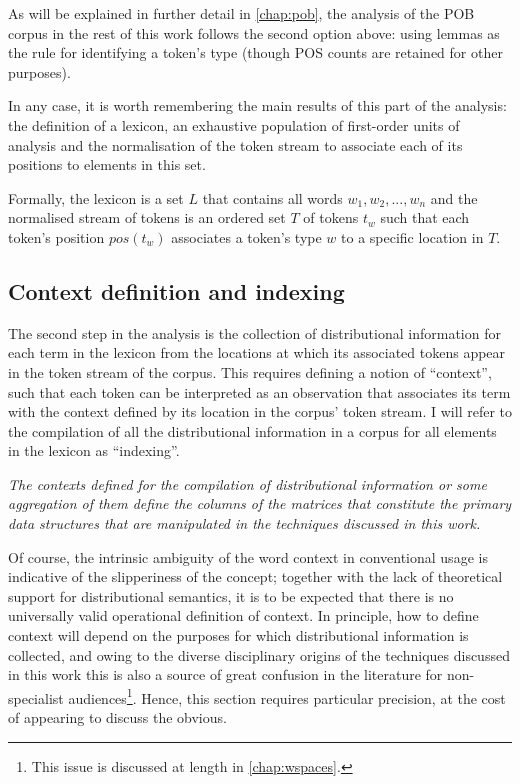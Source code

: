 As will be explained in further detail in \autoref{chap:pob}, the analysis of the POB corpus in the rest of this work follows the second option above: using lemmas as the rule for identifying a token's type (though POS counts are retained for other purposes).

In any case, it is worth remembering the main results of this part of the analysis: the definition of a lexicon, an exhaustive population of first-order units of analysis and the normalisation of the token stream to associate each of its positions to elements in this set.

Formally, the lexicon is a set $L$ that contains all words $w_1, w_2, ..., w_n$ and the normalised stream of tokens is an ordered set $T$ of tokens $t_w$ such that each token's position $pos( t_w )$ associates a token's type $w$ to a specific location in $T$.


\subsection{Context definition and indexing}
\label{subsec:index}

The second step in the analysis is the collection of distributional information for each term in the lexicon from the locations at which its associated tokens appear in the token stream of the corpus.
This requires defining a notion of ``context'', such that each token can be interpreted as an observation that associates its term with the context defined by its location in the corpus' token stream.
I will refer to the compilation of all the distributional information in a corpus for all elements in the lexicon as ``indexing''.

\emph{
    The contexts defined for the compilation of distributional information or some aggregation of them define the columns of the matrices that constitute the primary data structures that are manipulated in the techniques discussed in this work.
}

Of course, the intrinsic ambiguity of the word context in conventional usage is indicative of the slipperiness of the concept; together with the lack of theoretical support for distributional semantics, it is to be expected that there is no universally valid operational definition of context.
In principle, how to define context will depend on the purposes for which distributional information is collected, and owing to the diverse disciplinary origins of the techniques discussed in this work this is also a source of great confusion in the literature for non-specialist audiences\footnote{
    This issue is discussed at length in \autoref{chap:wspaces}.
}.
Hence, this section requires particular precision, at the cost of appearing to discuss the obvious.

